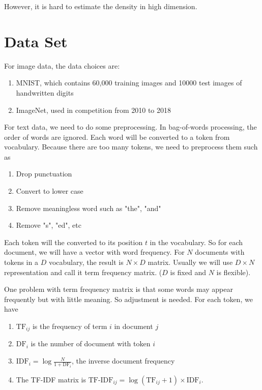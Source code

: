 However, it is hard to estimate the density in high dimension.



\section{Data Set}

\begin{example}
    For image data, the data choices are:
\begin{enumerate}
    \item MNIST, which contains 60,000 training images and 10000 test images of handwritten digits
    \item ImageNet, used in competition from 2010 to 2018
\end{enumerate}
\end{example}

\begin{definition}
    For text data, we need to do some preprocessing. In bag-of-words processing, the order of words are ignored. Each word will be converted to a token from vocabulary. Because there are too many tokens, we need to preprocess them such as 
\begin{enumerate}
    \item Drop punctuation
    \item Convert to lower case
    \item Remove meaningless word such as "the", "and"
    \item Remove "s", "ed", etc
\end{enumerate}
\end{definition}

\begin{definition}
    Each token will the converted to its position $t$ in the vocabulary. So for each document, we will have a vector with word frequency. For $N$ documents with tokens in a $D$ vocabulary, the result is $N \times D$ matrix. Usually we will use $D \times N$ representation and call it term frequency matrix. ($D$ is fixed and $N$ is flexible).
    
    
One problem with term frequency matrix is that some words may appear frequently but with little meaning. So adjustment is needed. For each token, we have
\begin{enumerate}
    \item $\text{TF}_{ij}$ is the frequency of term $i$ in document $j$
    \item $\text{DF}_i$ is the number of document with token $i$
    \item $\displaystyle \text{IDF}_i = \log \frac{N}{1 + \text{DF}_i}$, the inverse document frequency
    \item The TF-IDF matrix is $\text{TF-IDF}_{ij} = \log(\text{TF}_{ij} + 1) \times \text{IDF}_i$.
\end{enumerate}

\end{definition}

